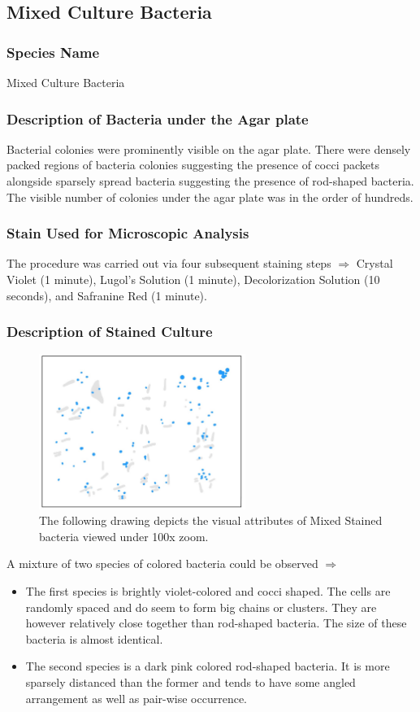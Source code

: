 \documentclass[pdflatex,sn-mathphys]{sn-jnl}%
\theoremstyle{thmstyleone}%
\theoremstyle{thmstyletwo}%
\theoremstyle{thmstylethree}%
\begin{document}
\subsection{Mixed Culture Bacteria}\label{subsec:mixed}
\subsubsection{Species Name}
Mixed Culture Bacteria
\subsubsection{Description of Bacteria under the Agar plate}
Bacterial colonies were prominently visible on the agar plate. There were
densely packed regions of bacteria colonies suggesting the presence of cocci
packets alongside sparsely spread bacteria suggesting the presence of
rod-shaped bacteria. The visible number of colonies under the agar plate was in
the order of hundreds.
\subsubsection{Stain Used for Microscopic Analysis}
The procedure was carried out via four subsequent staining steps $\Rightarrow$
Crystal Violet (1 minute), Lugol's Solution (1 minute), Decolorization Solution
(10 seconds), and Safranine Red (1 minute).

\subsubsection{Description of Stained Culture}
\begin{figure}[h]%
  \centering
  \includegraphics[width=0.6\textwidth]{photos/MC.jpg}
  \caption{The following drawing depicts the visual attributes of Mixed Stained bacteria viewed under 100x zoom. }\label{fig:mixed}
\end{figure}

A mixture of two species of colored bacteria could be observed $\Rightarrow$
\begin{itemize}
  \item The first species is brightly violet-colored and cocci shaped. The cells are
        randomly spaced and do seem to form big chains or clusters. They are however
        relatively close together than rod-shaped bacteria. The size of these bacteria
        is almost identical.
  \item The second species is a dark pink colored rod-shaped bacteria. It is more
        sparsely distanced than the former and tends to have some angled arrangement as
        well as pair-wise occurrence.
\end{itemize}
\end{document}
